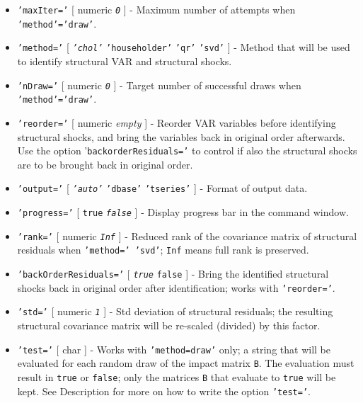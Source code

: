 \begin{itemize}
\item
  \texttt{'maxIter='} {[} numeric \textbar{} \emph{\texttt{0}} {]} -
  Maximum number of attempts when \texttt{'method'='draw'}.
\item
  \texttt{'method='} {[} \emph{\texttt{'chol'}} \textbar{}
  \texttt{'householder'} \textbar{} \texttt{'qr'} \textbar{}
  \texttt{'svd'} {]} - Method that will be used to identify structural
  VAR and structural shocks.
\item
  \texttt{'nDraw='} {[} numeric \textbar{} \emph{\texttt{0}} {]} -
  Target number of successful draws when \texttt{'method'='draw'}.
\item
  \texttt{'reorder='} {[} numeric \textbar{} \emph{empty} {]} - Reorder
  VAR variables before identifying structural shocks, and bring the
  variables back in original order afterwards. Use the option
  '\texttt{backorderResiduals='} to control if also the structural
  shocks are to be brought back in original order.
\item
  \texttt{'output='} {[} \emph{\texttt{'auto'}} \textbar{}
  \texttt{'dbase'} \textbar{} \texttt{'tseries'} {]} - Format of output
  data.
\item
  \texttt{'progress='} {[} \texttt{true} \textbar{}
  \emph{\texttt{false}} {]} - Display progress bar in the command
  window.
\item
  \texttt{'rank='} {[} numeric \textbar{} \emph{\texttt{Inf}} {]} -
  Reduced rank of the covariance matrix of structural residuals when
  \texttt{'method=' 'svd'}; \texttt{Inf} means full rank is preserved.
\item
  \texttt{'backOrderResiduals='} {[} \emph{\texttt{true}} \textbar{}
  \texttt{false} {]} - Bring the identified structural shocks back in
  original order after identification; works with \texttt{'reorder='}.
\item
  \texttt{'std='} {[} numeric \textbar{} \emph{\texttt{1}} {]} - Std
  deviation of structural residuals; the resulting structural covariance
  matrix will be re-scaled (divided) by this factor.
\item
  \texttt{'test='} {[} char {]} - Works with \texttt{'method=draw'}
  only; a string that will be evaluated for each random draw of the
  impact matrix \texttt{B}. The evaluation must result in \texttt{true}
  or \texttt{false}; only the matrices \texttt{B} that evaluate to
  \texttt{true} will be kept. See Description for more on how to write
  the option \texttt{'test='}.
\end{itemize}

